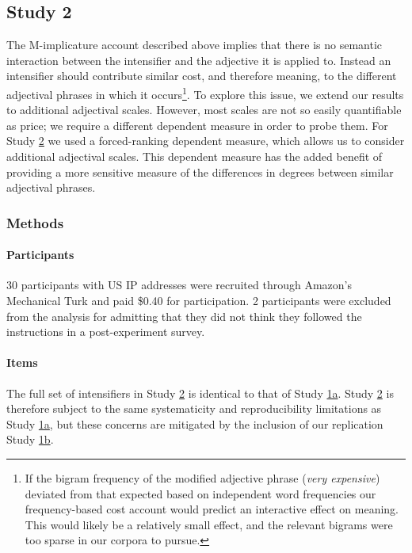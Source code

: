 \documentclass[10pt,letterpaper]{article}
\newcommand{\w}[1]{\emph{#1}}
\begin{document}
\subsection{Study 2 \label{sec:study2}}

The M-implicature account described above implies that there is no semantic interaction between the intensifier and the adjective it is applied to.
Instead an intensifier should contribute similar cost, and therefore meaning, to the different adjectival phrases in which it occurs\footnote{If the bigram frequency of the modified adjective phrase (\w{very expensive}) deviated from that expected based on independent word frequencies our frequency-based cost account would predict an interactive effect on meaning.
This would likely be a relatively small effect, and the relevant bigrams were too sparse in our corpora to pursue.}.
To explore this issue, we extend our results to additional adjectival scales.
However, most scales are not so easily quantifiable as price; we require a different dependent measure in order to probe them.
For Study \hyperref[sec:study2]{2} we used a forced-ranking dependent measure, which allows us to consider additional adjectival scales.
This dependent measure has the added benefit of providing a more sensitive measure of the differences in degrees between similar adjectival phrases.

\subsubsection{Methods}

\paragraph{Participants}

30 participants with US IP addresses were recruited through Amazon's Mechanical Turk and paid \$0.40 for  participation. 2 participants were excluded from the analysis for admitting that they did not think they followed the instructions in a post-experiment survey.

\paragraph{Items}

The full set of intensifiers in Study \hyperref[sec:study2]{2} is identical to that of Study \hyperref[sec:study1a]{1a}. Study \hyperref[sec:study2]{2} is therefore subject to the same systematicity and reproducibility limitations as Study \hyperref[sec:study1a]{1a}, but these concerns are mitigated by the inclusion of our replication Study \hyperref[sec:study1b]{1b}.
\end{document}
